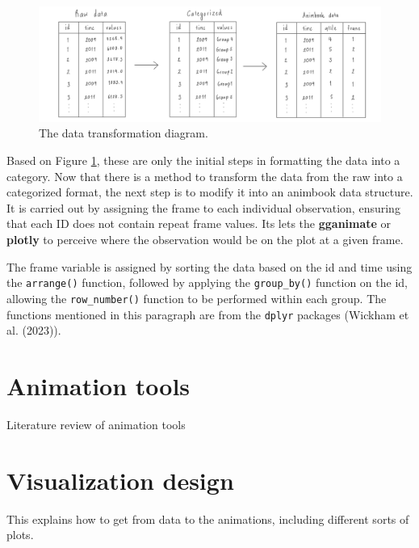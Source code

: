\begin{figure}

{\centering \includegraphics[width=1\linewidth]{figures/data-diagram} 

}

\caption{The data transformation diagram.}\label{fig:data-diagram}
\end{figure}

Based on Figure \ref{fig:data-diagram}, these are only the initial steps in formatting the data into a category. Now that there is a method to transform the data from the raw into a categorized format, the next step is to modify it into an animbook data structure. It is carried out by assigning the frame to each individual observation, ensuring that each ID does not contain repeat frame values. Its lets the \textbf{gganimate} or \textbf{plotly} to perceive where the observation would be on the plot at a given frame.

The frame variable is assigned by sorting the data based on the id and time using the \texttt{arrange()} function, followed by applying the \texttt{group\_by()} function on the id, allowing the \texttt{row\_number()} function to be performed within each group. The functions mentioned in this paragraph are from the \texttt{dplyr} packages (Wickham et al. (2023)).

\hypertarget{animation-tools}{%
\section{Animation tools}\label{animation-tools}}

Literature review of animation tools

\hypertarget{visualization-design}{%
\section{Visualization design}\label{visualization-design}}

This explains how to get from data to the animations, including different sorts of plots.

